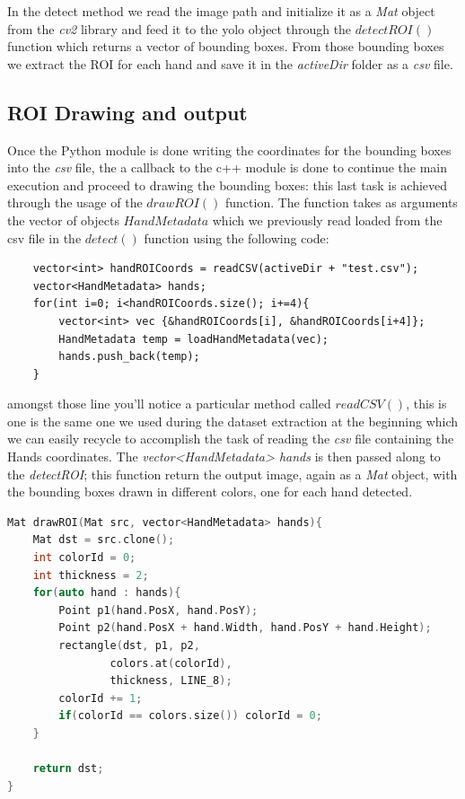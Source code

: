 In the detect method we read the image path and initialize it as a \textit{Mat}
object from the \textit{cv2} library and feed it to the
yolo object through the $detectROI()$ function which returns a vector of
bounding boxes. From those bounding boxes we extract the ROI for each hand and
save it in the
\textit{activeDir} folder as a \textit{csv} file.

\subsection{ROI Drawing and output}
Once the Python module is done writing the coordinates for the bounding boxes
into the \textit{csv} file,
the a callback to the c++ module is done to continue the main execution and
proceed to drawing the bounding boxes:
this last task is achieved through the usage of the $drawROI()$ function. The
function takes as arguments the vector of objects $HandMetadata$ which we
previously
read loaded from the csv file in the $detect()$ function using the following
code:

\begin{lstlisting}
    vector<int> handROICoords = readCSV(activeDir + "test.csv");
    vector<HandMetadata> hands;
    for(int i=0; i<handROICoords.size(); i+=4){
        vector<int> vec {&handROICoords[i], &handROICoords[i+4]};
        HandMetadata temp = loadHandMetadata(vec);
        hands.push_back(temp);
    }
\end{lstlisting}

amongst those line you'll notice a particular method called $readCSV()$, this
is one is the same one we used during the dataset extraction at the beginning
which we can easily recycle to accomplish the task of reading the \textit{csv}
file containing the Hands coordinates. The \textit{vector<HandMetadata> hands}
is then passed along to the \textit{detectROI}; this function return the output
image, again as a \textit{Mat} object, with the bounding boxes drawn in
different colors, one for each hand detected.

\begin{lstlisting}[language = c++]
    Mat drawROI(Mat src, vector<HandMetadata> hands){
    Mat dst = src.clone();
    int colorId = 0;
    int thickness = 2;
    for(auto hand : hands){
        Point p1(hand.PosX, hand.PosY);
        Point p2(hand.PosX + hand.Width, hand.PosY + hand.Height);
        rectangle(dst, p1, p2,
                colors.at(colorId),
                thickness, LINE_8);
        colorId += 1;
        if(colorId == colors.size()) colorId = 0;
    }
    
    return dst;
}

\end{lstlisting}


